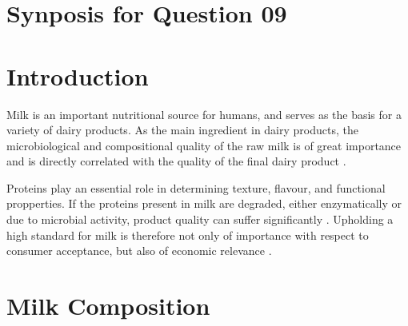 \setcounter{chapter}{2}
\setcounter{section}{0}
\section*{Synposis for Question 09}

\section{Introduction}
Milk is an important nutritional source for humans, and serves as the basis for a variety of dairy products. As the main ingredient in dairy products, the microbiological and compositional quality of  the raw milk is of great importance and is directly correlated with the quality of the final dairy product \cite*{a01_protein_degradation_in_bovine_milk}. 

Proteins play an essential role in determining texture, flavour, and functional propperties. If the proteins present in milk are degraded, either enzymatically or due to microbial activity, product quality can suffer significantly \cite*{a02_proteases_and_protein_degradation}. Upholding a high standard for milk is therefore not only of importance with respect to consumer acceptance, but also of economic relevance \cite*{a01_protein_degradation_in_bovine_milk}.








\section{Milk Composition}



